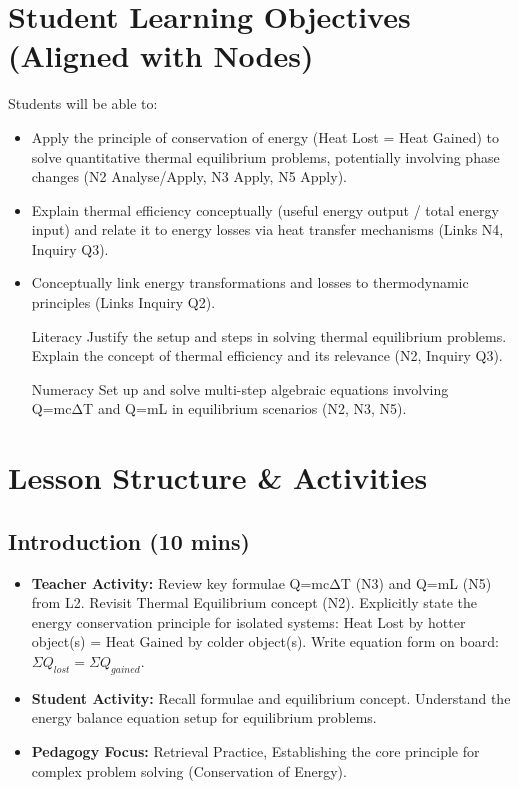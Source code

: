\documentclass[11pt, a4paper]{article}
\begin{document}
\section*{Student Learning Objectives (Aligned with Nodes)}
Students will be able to:
\begin{itemize}
    \item Apply the principle of conservation of energy (Heat Lost = Heat Gained) to solve quantitative thermal equilibrium problems, potentially involving phase changes (N2 Analyse/Apply, N3 Apply, N5 Apply).
    \item Explain thermal efficiency conceptually (useful energy output / total energy input) and relate it to energy losses via heat transfer mechanisms (Links N4, Inquiry Q3).
    \item Conceptually link energy transformations and losses to thermodynamic principles (Links Inquiry Q2).
    \item [Literacy] Justify the setup and steps in solving thermal equilibrium problems. Explain the concept of thermal efficiency and its relevance (N2, Inquiry Q3).
    \item [Numeracy] Set up and solve multi-step algebraic equations involving Q=mcΔT and Q=mL in equilibrium scenarios (N2, N3, N5).
\end{itemize}

\section*{Lesson Structure \& Activities}

\subsection*{Introduction (10 mins)}
\begin{itemize}
    \item \textbf{Teacher Activity:} Review key formulae Q=mcΔT (N3) and Q=mL (N5) from L2. Revisit Thermal Equilibrium concept (N2). Explicitly state the energy conservation principle for isolated systems: Heat Lost by hotter object(s) = Heat Gained by colder object(s). Write equation form on board: $\Sigma Q_{lost} = \Sigma Q_{gained}$.
    \item \textbf{Student Activity:} Recall formulae and equilibrium concept. Understand the energy balance equation setup for equilibrium problems.
    \item \textbf{Pedagogy Focus:} Retrieval Practice, Establishing the core principle for complex problem solving (Conservation of Energy).
\end{itemize}
\end{document}
